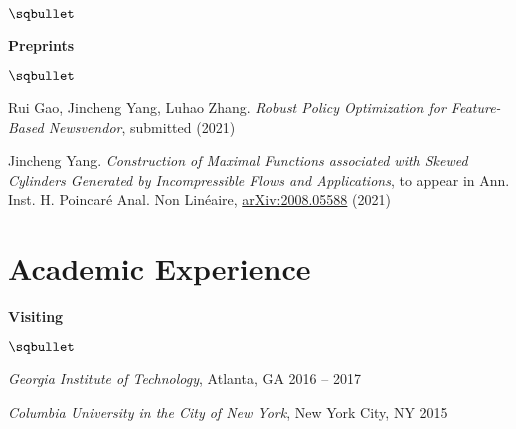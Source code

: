 \documentclass[margin,line]{res}
\newenvironment{list2}{
  \begin{list}{$\sqbullet$}{%
      \setlength{\itemsep}{0.05in}
      \setlength{\parsep}{0in} 
      \setlength{\parskip}{0in}
      \setlength{\topsep}{0.1in} 
      \setlength{\partopsep}{-0.07in} 
      \setlength{\leftmargin}{0.15in}
    }}
{\end{list}}
\begin{document}
\begin{resume}
\begin{list2}
\end{list2}

{\bf Preprints}

\begin{list2}

    \item Rui Gao, Jincheng Yang, Luhao Zhang. \textit{Robust Policy Optimization for Feature-Based Newsvendor}, submitted (2021) 

    \item Jincheng Yang. \textit{Construction of Maximal Functions associated with Skewed Cylinders Generated by Incompressible Flows and Applications}, to appear in 
    Ann. Inst. H. Poincar\'e Anal. Non Lin\'eaire,
    \href{https://arxiv.org/abs/2008.05588}{arXiv:2008.05588} (2021)
    
\end{list2}


% 


\section{\sc Academic Experience}

{\bf Visiting}

\begin{list2}

    \item \textit{Georgia Institute of Technology}, Atlanta, GA \hfill { 2016 -- 2017}
    \item \textit{Columbia University in the City of New York}, New York City, NY \hfill { 2015}


\end{list2}
\end{resume}
\end{document}
